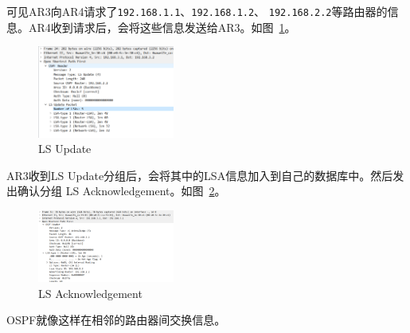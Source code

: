 \documentclass[a4paper,twoside]{article}
\begin{document}
\begin{spacing}{1.2}
可见AR3向AR4请求了\texttt{192.168.1.1}、\texttt{192.168.1.2}、
\texttt{192.168.2.2}等路由器的信息。AR4收到请求后，会将这些信息发送给AR3。如图~\ref{fig:lsupdate}。
\begin{figure}[htb]
	\centering
	\caption{LS Update}
	\label{fig:lsupdate}
	\includegraphics[width=0.4\textwidth]{lsresp.png}
\end{figure}

AR3收到LS Update分组后，会将其中的LSA信息加入到自己的数据库中。然后发出确认分组
LS Acknowledgement。如图~\ref{fig:lsack}。
\begin{figure}[htb]
	\centering
	\caption{LS Acknowledgement}
	\label{fig:lsack}
	\includegraphics[width=0.4\textwidth]{lsack.png}
\end{figure}

OSPF就像这样在相邻的路由器间交换信息。


\end{spacing}
\end{document}
